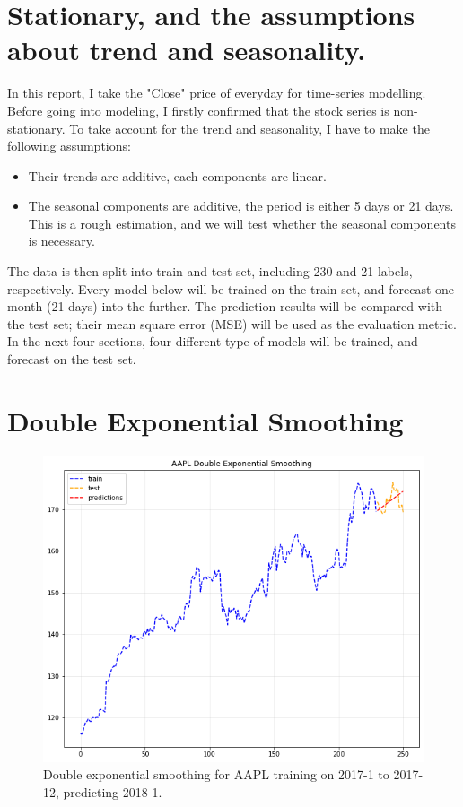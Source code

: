 \documentclass[11pt]{article}
\begin{document}
\section{Stationary, and the assumptions about trend and seasonality.}\label{section-dsmoothing}
In this report, I take the "Close" price of everyday for time-series modelling.
Before going into modeling, I firstly confirmed that the stock series is non-stationary.
To take account for the trend and seasonality, I have to make the following assumptions:

\begin{itemize}
\item Their trends are additive, each components are linear.
\item The seasonal components are additive, the period is either 5 days or 21 days. This is a rough estimation, and we will test whether the seasonal components is necessary.
\end{itemize}

The data is then split into train and test set, including 230 and 21 labels, respectively.
Every model below will be trained on the train set, and forecast one month (21 days) into the further.
The prediction results will be compared with the test set; their mean square error (MSE) will be used as the evaluation metric.
In the next four sections, four different type of models will be trained, and forecast on the test set.

\newpage

\section{Double Exponential Smoothing}\label{section-dsmoothing}

\begin{figure}[h!]
\centerline{\includegraphics[scale=0.5]{des_1.png}}
\caption{Double exponential smoothing for AAPL training on 2017-1 to 2017-12, predicting 2018-1.}
\end{figure}
\end{document}
